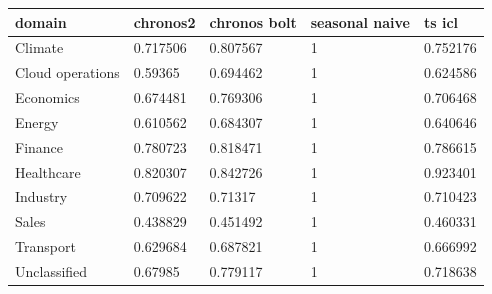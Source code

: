 \begin{tabular}{lllll}
\toprule
domain & chronos2 & chronos bolt & seasonal naive & ts icl \\
\midrule
Climate & 0.717506 & 0.807567 & 1 & 0.752176 \\
Cloud operations & 0.59365 & 0.694462 & 1 & 0.624586 \\
Economics & 0.674481 & 0.769306 & 1 & 0.706468 \\
Energy & 0.610562 & 0.684307 & 1 & 0.640646 \\
Finance & 0.780723 & 0.818471 & 1 & 0.786615 \\
Healthcare & 0.820307 & 0.842726 & 1 & 0.923401 \\
Industry & 0.709622 & 0.71317 & 1 & 0.710423 \\
Sales & 0.438829 & 0.451492 & 1 & 0.460331 \\
Transport & 0.629684 & 0.687821 & 1 & 0.666992 \\
Unclassified & 0.67985 & 0.779117 & 1 & 0.718638 \\
\bottomrule
\end{tabular}
